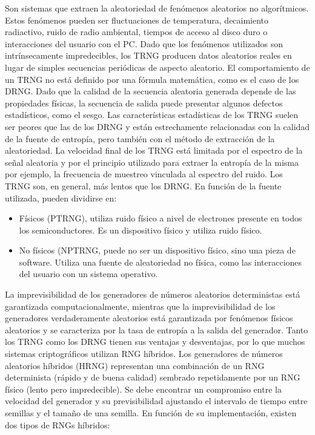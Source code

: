 \begin{enumerate}
		Son sistemas que extraen la aleatoriedad de fenómenos aleatorios no algorítmicos. Estos fenómenos pueden ser fluctuaciones de temperatura, decaimiento radiactivo, ruido de radio ambiental, tiempos de acceso al disco duro o interacciones del usuario con el PC. Dado que los fenómenos utilizados son intrínsecamente impredecibles, los TRNG producen datos aleatorios reales en lugar de simples secuencias periódicas de aspecto aleatorio. El comportamiento de un TRNG no está definido por una fórmula matemática, como es el caso de los DRNG. Dado que la calidad de la secuencia aleatoria generada depende de las propiedades físicas, la secuencia de salida puede presentar algunos defectos estadísticos, como el 	sesgo. Las características estadísticas de los TRNG suelen ser peores que las de los DRNG	y están estrechamente relacionadas con la calidad de la fuente de entropía, pero también con el método de extracción de la aleatoriedad. La velocidad final de los TRNG está limitada por el espectro de la señal aleatoria y por el principio utilizado para extraer la entropía de la misma por ejemplo, la frecuencia de muestreo vinculada al espectro del ruido. Los TRNG son, en general, más lentos que los DRNG. En función de la fuente utilizada, pueden dividirse en:
		\begin{itemize}
			\item Físicos (PTRNG), utiliza ruido físico a nivel de electrones presente en todos los semiconductores. Es un dispositivo físico y utiliza ruido físico.
			\item No físicos (NPTRNG, puede no ser un dispositivo físico, sino una pieza de software. Utiliza una fuente de aleatoriedad no física, como las interacciones del usuario con un sistema operativo.
		\end{itemize}
	\end{enumerate}
	
	La imprevisibilidad de los generadores de números aleatorios deterministas está garantizada computacionalmente, mientras que la imprevisibilidad de los generadores verdaderamente aleatorios está garantizada por fenómenos físicos aleatorios y se caracteriza por la tasa de entropía a la salida del generador. Tanto los TRNG como los DRNG tienen sus ventajas y desventajas, por lo que muchos sistemas criptográficos utilizan RNG híbridos. Los generadores de números aleatorios híbridos (HRNG) representan una combinación de un RNG determinista (rápido y de buena calidad) sembrado repetidamente por un RNG físico (lento pero impredecible). Se debe encontrar un compromiso entre la velocidad del generador y su previsibilidad ajustando el intervalo de tiempo entre semillas y el tamaño de una semilla. 	En función de su implementación, existen dos tipos de RNGs híbridos:
	
